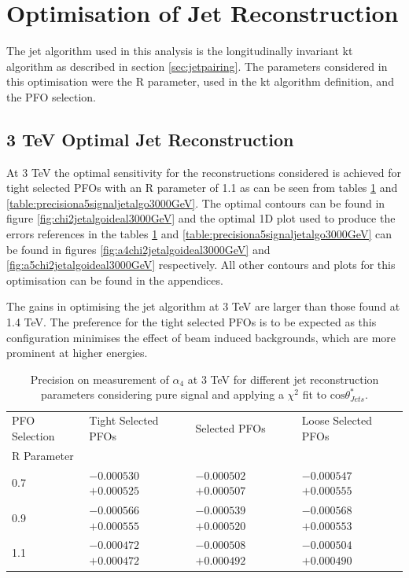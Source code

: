 \section{Optimisation of Jet Reconstruction} \label{sec:optimisationjetalgo}
The jet algorithm used in this analysis is the longitudinally invariant kt algorithm as described in section \ref{sec:jetpairing}.  The parameters considered in this optimisation were the R parameter, used in the kt algorithm definition, and the PFO selection.  




\subsection{3 TeV Optimal Jet Reconstruction}
At 3 TeV the optimal sensitivity for the reconstructions considered is achieved for tight selected PFOs with an R parameter of 1.1 as can be seen from tables \ref{table:precisiona4signaljetalgo3000GeV} and \ref{table:precisiona5signaljetalgo3000GeV}.  The optimal contours can be found in figure \ref{fig:chi2jetalgoideal3000GeV} and the optimal 1D plot used to produce the errors references in the tables \ref{table:precisiona4signaljetalgo3000GeV} and \ref{table:precisiona5signaljetalgo3000GeV} can be found in figures \ref{fig:a4chi2jetalgoideal3000GeV} and \ref{fig:a5chi2jetalgoideal3000GeV} respectively.  All other contours and plots for this optimisation can be found in the appendices.  

The gains in optimising the jet algorithm at 3 TeV are larger than those found at 1.4 TeV.  The preference for the tight selected PFOs is to be expected as this configuration minimises the effect of beam induced backgrounds, which are more prominent at higher energies.  

\begin{table}[h!]
\centering
\begin{tabular}{ l l l l }
\hline
PFO Selection & Tight Selected PFOs & Selected PFOs & Loose Selected PFOs \\ 
R Parameter & & & \\ 
\hline
0.7 & $-0.000530$ $+0.000525$ & $-0.000502$ $+0.000507$ & $-0.000547$ $+0.000555$ \\
0.9 & $-0.000566$ $+0.000555$ & $-0.000539$ $+0.000520$ & $-0.000568$ $+0.000553$ \\
1.1 & $-0.000472$ $+0.000472$ & $-0.000508$ $+0.000492$ & $-0.000504$ $+0.000490$ \\
\hline
\end{tabular}
\caption[$1\sigma$ precision on measurement of $\alpha_{4}$ for different jet reconstruction parameters considering pure signal at 3 TeV.]{Precision on measurement of $\alpha_{4}$ at 3 TeV for different jet reconstruction parameters considering pure signal and applying a $\chi^{2}$ fit to $\text{cos}\theta^{*}_{Jets}$.}
\label{table:precisiona4signaljetalgo3000GeV}
\end{table}

